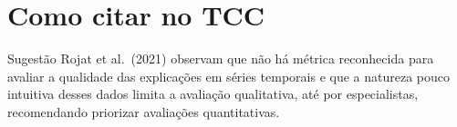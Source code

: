 \documentclass[11pt,a4paper]{article}
\begin{document}
\section{Como citar no TCC}
\begin{infobox}[ok]{Sugestão}
Rojat et al.\ (2021) observam que não há métrica reconhecida para avaliar a qualidade das explicações em séries temporais e que a natureza pouco intuitiva desses dados limita a avaliação qualitativa, até por especialistas, recomendando priorizar avaliações quantitativas.
\end{infobox}
\end{document}
